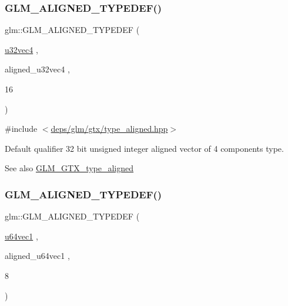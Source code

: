 \subsubsection{\texorpdfstring{G\+L\+M\+\_\+\+A\+L\+I\+G\+N\+E\+D\+\_\+\+T\+Y\+P\+E\+D\+E\+F()}{GLM\_ALIGNED\_TYPEDEF()}\hspace{0.1cm}{\footnotesize\ttfamily [132/209]}}
{\footnotesize\ttfamily glm\+::\+G\+L\+M\+\_\+\+A\+L\+I\+G\+N\+E\+D\+\_\+\+T\+Y\+P\+E\+D\+EF (\begin{DoxyParamCaption}\item[{\hyperlink{group__gtc__type__precision_gad3f72b91c5b7efbc377625c44433824d}{u32vec4}}]{,  }\item[{aligned\+\_\+u32vec4}]{,  }\item[{16}]{ }\end{DoxyParamCaption})}



{\ttfamily \#include $<$\hyperlink{gtx_2type__aligned_8hpp}{deps/glm/gtx/type\+\_\+aligned.\+hpp}$>$}

Default qualifier 32 bit unsigned integer aligned vector of 4 components type. \begin{DoxySeeAlso}{See also}
\hyperlink{group__gtx__type__aligned}{G\+L\+M\+\_\+\+G\+T\+X\+\_\+type\+\_\+aligned} 
\end{DoxySeeAlso}
\mbox{\label{group__gtx__type__aligned_gab253845f534a67136f9619843cade903}} 
\subsubsection{\texorpdfstring{G\+L\+M\+\_\+\+A\+L\+I\+G\+N\+E\+D\+\_\+\+T\+Y\+P\+E\+D\+E\+F()}{GLM\_ALIGNED\_TYPEDEF()}\hspace{0.1cm}{\footnotesize\ttfamily [133/209]}}
{\footnotesize\ttfamily glm\+::\+G\+L\+M\+\_\+\+A\+L\+I\+G\+N\+E\+D\+\_\+\+T\+Y\+P\+E\+D\+EF (\begin{DoxyParamCaption}\item[{\hyperlink{group__gtc__type__precision_gaf01aa7972f78cabc61558a0171d78a01}{u64vec1}}]{,  }\item[{aligned\+\_\+u64vec1}]{,  }\item[{8}]{ }\end{DoxyParamCaption})}



